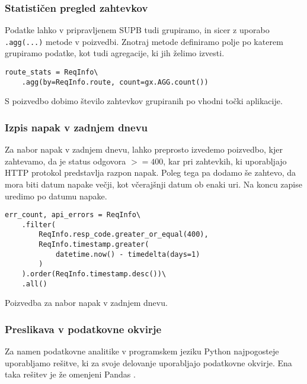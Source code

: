 \documentclass[a4paper,12pt,openright]{book}
\begin{document}
    \newpage
    \subsubsection{Statističen pregled zahtevkov}

    Podatke lahko v pripravljenem SUPB tudi grupiramo, in sicer z uporabo {\tt .agg(...)} metode v poizvedbi. Znotraj metode definiramo polje po katerem grupiramo podatke, kot tudi agregacije, ki jih želimo izvesti.
    
\begin{verbatim}
route_stats = ReqInfo\
    .agg(by=ReqInfo.route, count=gx.AGG.count())
\end{verbatim}

    \noindent
    S poizvedbo dobimo število zahtevkov grupiranih po vhodni točki aplikacije. 

    \subsubsection{Izpis napak v zadnjem dnevu}

    Za nabor napak v zadnjem dnevu, lahko preprosto izvedemo poizvedbo, kjer zahtevamo, da je status odgovora $>= 400$, kar pri zahtevkih, ki uporabljajo HTTP protokol predstavlja razpon napak. Poleg tega pa dodamo še zahtevo, da mora biti datum napake večji, kot včerajšnji datum ob enaki uri. Na koncu zapise uredimo po datumu napake.

\begin{code}
\begin{verbatim}
err_count, api_errors = ReqInfo\
    .filter(
        ReqInfo.resp_code.greater_or_equal(400),
        ReqInfo.timestamp.greater(
            datetime.now() - timedelta(days=1)
        )
    ).order(ReqInfo.timestamp.desc())\
    .all()
\end{verbatim}
\caption{Poizvedba za nabor napak v zadnjem dnevu.}
\label{api_errors_code}
\end{code}

    \subsubsection{Preslikava v podatkovne okvirje}

    Za namen podatkovne analitike v programskem jeziku Python najpogosteje uporabljamo rešitve, ki za svoje delovanje uporabljajo podatkovne okvirje. Ena taka rešitev je že omenjeni Pandas \cite{PANDAS_GITHUB}.
    
\end{document}
